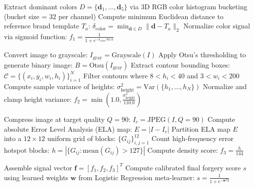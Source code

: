 \begin{algorithm}[H]
\caption{Cross-Modal Forensic Alignment (CMFA)}
\label{alg:cmfa}

\BlankLine
{}
Extract dominant colors $D = \{\mathbf{d}_1, \dots, \mathbf{d}_5\}$ via 3D RGB color histogram bucketing (bucket size = $32$ per channel)\;
Compute minimum Euclidean distance to reference brand template $T_a$:
$\delta_{\text{color}} = \min_{\mathbf{d} \in D} \|\mathbf{d} - T_a\|_2$\;
Normalize color signal via sigmoid function:
$f_1 = \frac{1}{1 + e^{-\delta_{\text{color}} / 85.0}}$\;

\BlankLine
{}
Convert image to grayscale: $I_{\text{gray}} = \text{Grayscale}(I)$\;
Apply Otsu's thresholding to generate binary image: $B = \text{Otsu}(I_{\text{gray}})$\;
Extract contour bounding boxes: $\mathcal{C} = \{(x_i, y_i, w_i, h_i)\}_{i=1}^N$\;
Filter contours where $8 < h_i < 40$ and $3 < w_i < 200$\;
Compute sample variance of heights: $\sigma^2_{\text{height}} = \text{Var}(\{h_1, \dots, h_N\})$\;
Normalize and clamp height variance:
$f_2 = \min\left(1.0, \frac{\sigma^2_{\text{height}}}{110.0}\right)$\;

\BlankLine
{}
Compress image at target quality $Q=90$: $I_c = \text{JPEG}(I, Q=90)$\;
Compute absolute Error Level Analysis (ELA) map: $E = |I - I_c|$\;
Partition ELA map $E$ into a $12 \times 12$ uniform grid of blocks: $\{G_{ij}\}_{i,j=1}^{12}$\;
Count high-frequency error hotspot blocks:
$h = \left| \{G_{ij} : \text{mean}(G_{ij}) > 127\} \right|$\;
Compute density score:
$f_3 = \frac{h}{144}$\;

\BlankLine
{}
Assemble signal vector $\mathbf{f} = [f_1, f_2, f_3]^T$\;
Compute calibrated final forgery score $s$ using learned weights $\mathbf{w}$ from Logistic Regression meta-learner:
$s = \frac{1}{1 + e^{-\mathbf{w}^T \mathbf{f}}}$\;

\;
\end{algorithm}
